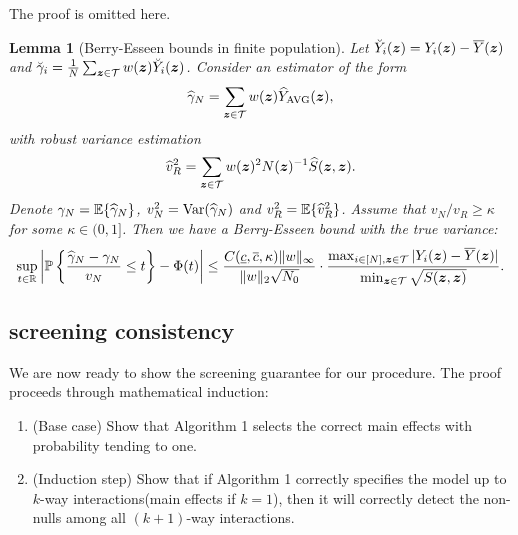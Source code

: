 \documentclass[12pt]{article}
\newtheorem{lemma}{Lemma}
\begin{document}
The proof is omitted here.

\begin{lemma}[Berry-Esseen bounds in finite population]\label{lem:BE-finite-pop}
Let $\breve{Y}_i({\boldsymbol{z}}) = Y_i({\boldsymbol{z}}) - \overline{Y}({\boldsymbol{z}})$ and $\breve{\gamma}_i = \frac{1}{N}\sum_{{\boldsymbol{z}}\in{\mathcal{T}}}w({\boldsymbol{z}})\breve{Y}_i({\boldsymbol{z}})$. Consider an estimator of the form
\begin{align*}
    {\widehat{\gamma}}_N = \sum_{{\boldsymbol{z}}\in{\mathcal{T}}} w({\boldsymbol{z}})\widehat{Y}_{\operatorname{AVG}}({\boldsymbol{z}}),
\end{align*}
with robust variance estimation
\begin{align*}
    \widehat{v}^2_R = \sum_{{\boldsymbol{z}}\in{\mathcal{T}}} w({\boldsymbol{z}})^2 N({\boldsymbol{z}})^{-1} \widehat{S}({\boldsymbol{z}},{\boldsymbol{z}}).
\end{align*}
Denote $\gamma_N = {\mathbb{E}}\{{\widehat{\gamma}}_N\}$, $v_N^2 = \operatorname{Var}({\widehat{\gamma}}_N)$ and $v^2_R = {\mathbb{E}}\{\widehat{v}^2_R\}$.
Assume that ${v_N}/{v_R} \ge \kappa$ for some $\kappa \in (0,1]$. Then we have a Berry-Esseen bound with the true variance:
\begin{align*}
  \sup_{t\in{\mathbb{R}}} \left|{\mathbb{P}}\left\{\frac{{\widehat{\gamma}}_N - \gamma_N}{v_N}\le t\right\} - \Phi(t)\right| \le \frac{C(\underline{c}, \overline{c}, \kappa) \|w\|_\infty }{\|w\|_2\sqrt{N_0}}\cdot \frac{\max_{i\in[N],{\boldsymbol{z}}\in{\mathcal{T}}}|Y_i({\boldsymbol{z}}) - \overline{Y}({\boldsymbol{z}})|}{\min_{{\boldsymbol{z}}\in{\mathcal{T}}}\sqrt{S({\boldsymbol{z}},{\boldsymbol{z}})}}.
\end{align*}



\end{lemma}


\subsection{ screening consistency}

We are now ready to show the  screening guarantee for our procedure. The proof proceeds through mathematical induction:
\begin{enumerate}
    \item (Base case) Show that Algorithm 1 selects the correct main effects with probability tending to one.
    
    \item (Induction step) Show that if Algorithm 1 correctly specifies the model up to $k$-way interactions(main effects if $k=1$), then it will correctly detect the non-nulls among all $(k+1)$-way interactions. 
\end{enumerate}
\end{document}
